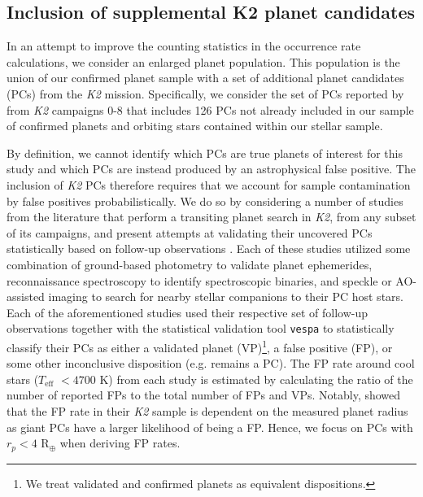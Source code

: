 \documentclass[twocolumn]{emulateapj}
\newcommand{\ktwo}[1]{\emph{K2}#1}
\newcommand{\teff}[1]{$T_{\text{eff}}$#1}
\begin{document}
\subsection{Inclusion of supplemental K2 planet candidates}
In an attempt to improve the counting statistics in the occurrence rate calculations,
we consider an enlarged planet population. This population is the union of our confirmed planet sample with
a set of additional planet candidates (PCs) from the \ktwo{}
mission. Specifically, we consider the set of PCs reported by \cite{kruse19}
from \ktwo{} campaigns 0-8 that includes 126 PCs not already included in our sample of confirmed planets
and orbiting stars contained within our stellar sample.

By definition, we cannot identify which PCs are true planets of interest for this study and
which PCs are instead produced by an astrophysical false positive. 
The inclusion of \ktwo{} PCs therefore requires that we account for sample contamination by false positives
probabilistically. We do so by considering
a number of studies from the literature that perform a transiting planet search in \ktwo{,} from any subset of its campaigns,
and present attempts at validating their uncovered PCs statistically based on follow-up observations
\citep{montet15,crossfield16b,dressing17,hirano18,livingston18a,mayo18}. Each of these studies utilized some combination of
ground-based photometry to validate planet ephemerides, reconnaissance
spectroscopy to identify spectroscopic binaries, and speckle or AO-assisted imaging to search for nearby stellar companions to
their PC host stars. Each of the aforementioned studies used their respective set of follow-up observations together with the
statistical validation tool \texttt{vespa} \citep{morton12,morton15} to statistically classify their PCs as either a validated
planet (VP)\footnote{We treat validated and confirmed planets as equivalent dispositions.},
a false positive (FP), or some other inconclusive disposition (e.g. remains a PC). The FP rate around cool
stars (\teff{} $< 4700$ K) from each study is estimated by calculating the ratio of the number of reported FPs to
the total number of FPs and VPs. Notably, \cite{crossfield16b} showed that the FP rate in their \ktwo{} sample is dependent
on the measured planet radius as giant PCs have a larger likelihood of
being a FP. Hence, we focus on PCs with $r_p<4$ R$_{\oplus}$ when deriving FP rates.
\end{document}
